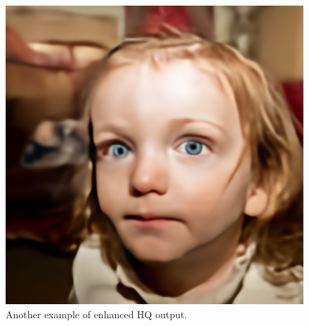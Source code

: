 \begin{figure}[htbp]
\begin{minipage}{0.45\textwidth}
        \includegraphics[width=\textwidth]{imgs/output_00386.png}
        \caption{Another example of enhanced HQ output.}
        \label{fig:image2}
    \end{minipage}
\end{figure}

